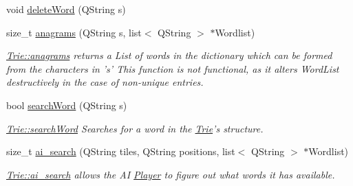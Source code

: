 \begin{DoxyCompactItemize}
void \hyperlink{class_trie_a0d142e459d38dead80a72de5152e76d9}{delete\-Word} (Q\-String s)
\item 
size\-\_\-t \hyperlink{class_trie_aa42c01330538b67e0aff76068f02a8f7}{anagrams} (Q\-String s, list$<$ Q\-String $>$ $\ast$Wordlist)
\begin{DoxyCompactList}\small\item\em \hyperlink{class_trie_aa42c01330538b67e0aff76068f02a8f7}{Trie\-::anagrams} returns a List of words in the dictionary which can be formed from the characters in 's' This function is not functional, as it alters Word\-List destructively in the case of non-\/unique entries. \end{DoxyCompactList}\item 
bool \hyperlink{class_trie_a5dd39899df7410211d9d7294e548f5b0}{search\-Word} (Q\-String s)
\begin{DoxyCompactList}\small\item\em \hyperlink{class_trie_a5dd39899df7410211d9d7294e548f5b0}{Trie\-::search\-Word} Searches for a word in the \hyperlink{class_trie}{Trie}'s structure. \end{DoxyCompactList}\item 
size\-\_\-t \hyperlink{class_trie_ac6a915f9483d03dc99872210b74bf435}{ai\-\_\-search} (Q\-String tiles, Q\-String positions, list$<$ Q\-String $>$ $\ast$Wordlist)
\begin{DoxyCompactList}\small\item\em \hyperlink{class_trie_ac6a915f9483d03dc99872210b74bf435}{Trie\-::ai\-\_\-search} allows the A\-I \hyperlink{class_player}{Player} to figure out what words it has available. \end{DoxyCompactList}\end{DoxyCompactItemize}
